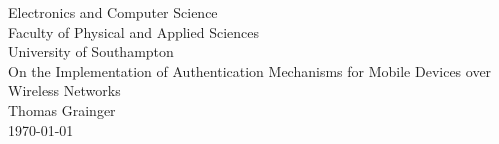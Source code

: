 \begin{titlepage}

\begin{center}

{\large Electronics and Computer Science\\
Faculty of Physical and Applied Sciences\\
University of Southampton}\\[5em]

{\LARGE On the Implementation of Authentication Mechanisms for Mobile Devices over Wireless Networks}\\[5em]

{\large Thomas Grainger}\\[5em]

{\large \today}\\[5em]


\end{center}

\end{titlepage}
